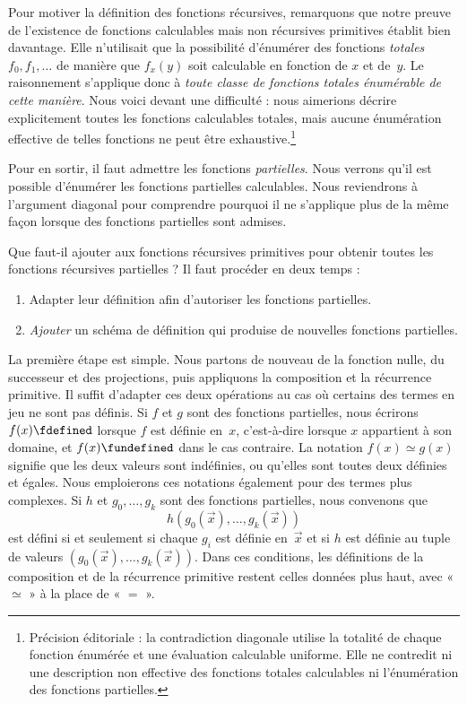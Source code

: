 \documentclass[../../../include/open-logic-section]{subfiles}
\begin{document}

Pour motiver la définition des fonctions récursives, remarquons que
notre preuve de l'existence de fonctions calculables mais non
récursives primitives établit bien davantage. Elle n'utilisait
que la possibilité d'énumérer des fonctions \emph{totales}
$f_0,f_1,\dots$ de manière que $f_x(y)$ soit calculable en
fonction de $x$ et de~$y$. Le raisonnement s'applique donc à
\emph{toute classe de fonctions totales énumérable de cette
manière}. Nous voici devant une difficulté : nous aimerions
décrire explicitement toutes les fonctions calculables totales,
mais aucune énumération effective de telles fonctions ne peut
être exhaustive.\footnote{Précision éditoriale : la contradiction diagonale utilise la totalité de chaque fonction énumérée et une évaluation calculable uniforme. Elle ne contredit ni une description non effective des fonctions totales calculables ni l'énumération des fonctions partielles.}

Pour en sortir, il faut admettre les fonctions \emph{partielles}.
Nous verrons qu'il est possible d'énumérer les fonctions
partielles calculables. Nous reviendrons à l'argument
diagonal pour comprendre pourquoi il ne s'applique plus de
la même façon lorsque des fonctions partielles sont admises.

Que faut-il ajouter aux fonctions récursives primitives pour
obtenir toutes les fonctions récursives partielles ? Il faut
procéder en deux temps :
\begin{enumerate}
\item Adapter leur définition afin d'autoriser les fonctions
  partielles.
\item \emph{Ajouter} un schéma de définition qui produise
  de nouvelles fonctions partielles.
\end{enumerate}

La première étape est simple. Nous partons de nouveau de la
fonction nulle, du successeur et des projections, puis appliquons
la composition et la récurrence primitive. Il suffit d'adapter
ces deux opérations au cas où certains des termes en jeu ne
sont pas définis. Si $f$ et $g$ sont des fonctions partielles,
nous écrirons $f(x) \fdefined$ lorsque $f$ est définie en~$x$,
c'est-à-dire lorsque $x$ appartient à son domaine, et
$f(x) \fundefined$ dans le cas contraire. La notation
$f(x) \simeq g(x)$ signifie que les deux valeurs sont
indéfinies, ou qu'elles sont toutes deux définies et égales.
Nous emploierons ces notations également pour des termes plus
complexes. Si $h$ et $g_0,\dots,g_k$ sont des fonctions
partielles, nous convenons que
\[
h(g_0(\vec x),\dots,g_k(\vec x))
\]
est défini si et seulement si chaque $g_i$ est définie
en~$\vec x$ et si $h$ est définie au tuple de valeurs
$(g_0(\vec x),\dots,g_k(\vec x))$. Dans ces conditions, les
définitions de la composition et de la récurrence primitive
restent celles données plus haut, avec « $\simeq$ » à la
place de « $=$ ».
\end{document}
